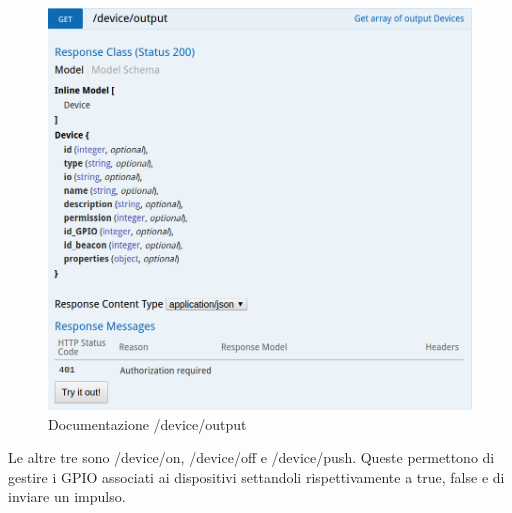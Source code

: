 \begin{figure}[h]
\centering
\includegraphics[width=1\textwidth]{API/device_output.png} 
\caption{Documentazione /device/output}
\label{fig:device:output}
\end{figure}

Le altre tre sono /device/on, /device/off e /device/push.
Queste permettono di gestire i GPIO associati ai dispositivi settandoli rispettivamente a true, false e di inviare un impulso.

